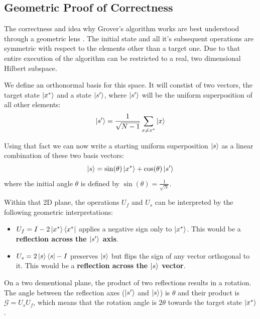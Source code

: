 \subsection{Geometric Proof of Correctness}
%
%

\bigskip
The correctness and idea why Grover's algorithm works are best understood through a geometric lens \cite{brassard2002quantum, boyer1998tight}. 
The initial state and all it's subsequent operations are symmetric with respect to the elements other than a target one. 
Due to that entire execution of the algorithm can be restricted to a real, two dimensional Hilbert subspace. 
%
%

\bigskip
We define an orthonormal basis for this space. It will constist of two vectors, the target state $\ket{x^*}$ and a state $\ket{s'}$, 
where $\ket{s'}$ will be the uniform superposition of all other elements:
\bigskip
\begin{equation}
    \ket{s'} = \frac{1}{\sqrt{N-1}} \sum_{x \neq x^*} \ket{x}
\end{equation}
\bigskip
%
%

Using that fact we can now write a starting uniform superposition $\ket{s}$ as a linear combination of these two basis vectors:
\bigskip
\begin{equation}
    \ket{s} = \sin(\theta)\ket{x^*} + \cos(\theta)\ket{s'}
\end{equation}
\bigskip
where the initial angle $\theta$ is defined by $\sin(\theta) = \frac{1}{\sqrt{N}}$.
%
%

\bigskip
Within that 2D plane, the operations $U_f$ and $U_s$ can be interpreted by the following geometric interpretations:
\begin{itemize}
    \item $U_f = I - 2\ket{x^*}\bra{x^*}$ applies a negative sign only to $\ket{x^*}$. 
    This would be a \textbf{reflection across the $\ket{s'}$ axis}.
    \item $U_s = 2\ket{s}\bra{s} - I$ preserves $\ket{s}$ but flips the sign of any vector orthogonal to it. 
    This would be a \textbf{reflection across the $\ket{s}$ vector}.
\end{itemize}
%
%

\bigskip
On a two dementional plane, the product of two reflections results in a rotation. 
The angle between the reflection axes ($\ket{s'}$ and $\ket{s}$) is $\theta$ and their product is $\mathcal{G} = U_s U_f$, 
which means that the rotation angle is $2\theta$ towards the target state $\ket{x^*}$. 
%
%

